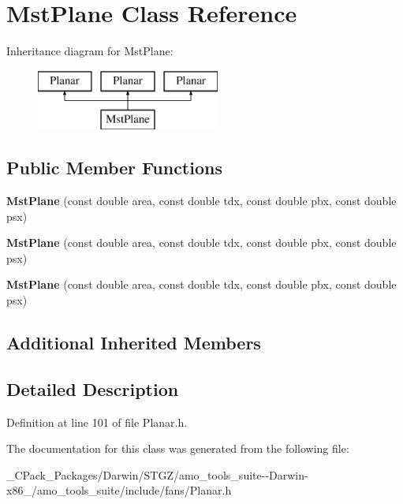 \hypertarget{class_mst_plane}{}\section{Mst\+Plane Class Reference}
\label{class_mst_plane}
Inheritance diagram for Mst\+Plane\+:\begin{figure}[H]
\begin{center}
\leavevmode
\includegraphics[height=2.000000cm]{d5/dd0/class_mst_plane}
\end{center}
\end{figure}
\subsection*{Public Member Functions}
\begin{DoxyCompactItemize}
\item 
\mbox{\label{class_mst_plane_a7ecba572a4fbe043a4d9847c356c9ab5}} 
{\bfseries Mst\+Plane} (const double area, const double tdx, const double pbx, const double psx)
\item 
\mbox{\label{class_mst_plane_a7ecba572a4fbe043a4d9847c356c9ab5}} 
{\bfseries Mst\+Plane} (const double area, const double tdx, const double pbx, const double psx)
\item 
\mbox{\label{class_mst_plane_a7ecba572a4fbe043a4d9847c356c9ab5}} 
{\bfseries Mst\+Plane} (const double area, const double tdx, const double pbx, const double psx)
\end{DoxyCompactItemize}
\subsection*{Additional Inherited Members}


\subsection{Detailed Description}


Definition at line 101 of file Planar.\+h.



The documentation for this class was generated from the following file\+:\begin{DoxyCompactItemize}
\item 
\+\_\+\+C\+Pack\+\_\+\+Packages/\+Darwin/\+S\+T\+G\+Z/amo\+\_\+tools\+\_\+suite-\/-\/\+Darwin-\/x86\+\_/amo\+\_\+tools\+\_\+suite/include/fans/Planar.\+h\end{DoxyCompactItemize}
